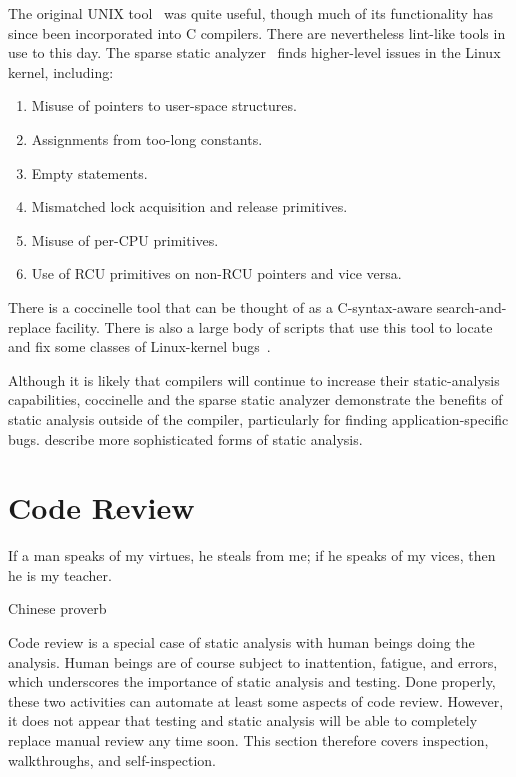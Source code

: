 The original UNIX  tool~\cite{StephenJohnson1977lint} was
quite useful, though much of its functionality has since been incorporated
into C compilers.
There are nevertheless lint-like tools in use to this day.
The sparse static analyzer~\cite{JonathanCorbet2004sparse}
finds higher-level issues in the Linux kernel, including:

\begin{enumerate}
\item	Misuse of pointers to user-space structures.
\item	Assignments from too-long constants.
\item	Empty  statements.
\item	Mismatched lock acquisition and release primitives.
\item	Misuse of per-CPU primitives.
\item	Use of RCU primitives on non-RCU pointers and vice versa.
\end{enumerate}

There is a coccinelle tool that can be thought of as a C-syntax-aware
search-and-replace facility.
There is also a large body of scripts that use this tool to locate
and fix some classes of Linux-kernel
bugs~\cite{NicolasPalix2011CoccinelleTenYears}.

Although it is likely that compilers will continue to increase their
static-analysis capabilities, coccinelle and the sparse static analyzer
demonstrate the benefits of static analysis outside of the compiler,
particularly for finding application-specific bugs.
describe more sophisticated forms of static analysis.

\section{Code Review}
\label{sec:debugging:Code Review}
%
\epigraph{If a man speaks of my virtues, he steals from me;
	  if he speaks of my vices, then he is my teacher.}
	 {Chinese proverb}

Code review is a special case of static analysis with human beings doing
the analysis.
Human beings are of course subject to inattention, fatigue, and errors,
which underscores the importance of static analysis and testing.
Done properly, these two activities can automate at least some aspects
of code review.
However, it does not appear that testing and static analysis will be able
to completely replace manual review any time soon.
This section therefore covers inspection, walkthroughs, and self-inspection.

